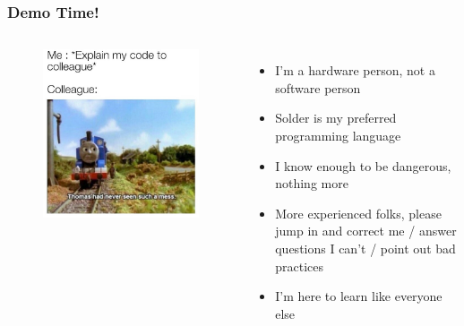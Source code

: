 \documentclass[t]{beamer}
\begin{document}
\begin{frame}[t]
\frametitle{Demo Time!}
\begin{columns}
	\begin{figure}
		\includegraphics[scale=0.45]{thomasTankCode.jpg}
	\end{figure}	
	\begin{itemize}
		\item I'm a hardware person, not a software person
		\item Solder is my preferred programming language
		\item I know enough to be dangerous, nothing more
		\item More experienced folks, please jump in and correct me / answer questions I can't / point out bad practices
		\item I'm here to learn like everyone else
	\end{itemize}
	
\end{columns}


\end{frame}

\end{document}

